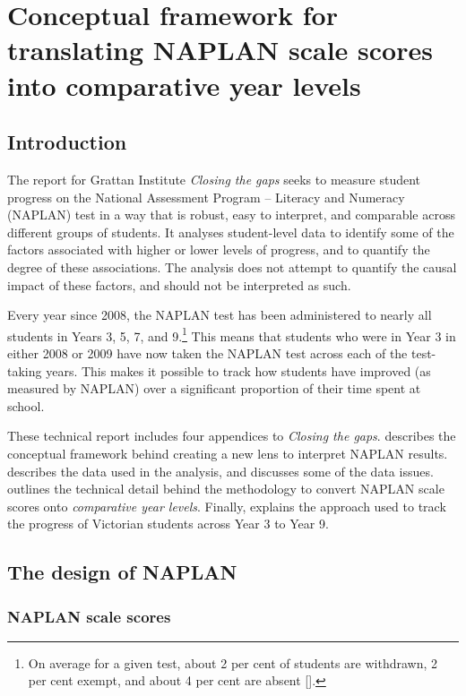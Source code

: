 \chapter{Conceptual framework for translating NAPLAN scale scores into comparative year levels} \label{chap1}

\section{Introduction}

The report for Grattan Institute \textit{Closing the gaps} seeks to measure student progress on the National Assessment Program -- Literacy and Numeracy (NAPLAN) test in a way that is robust, easy to interpret, and comparable across different groups of students. It analyses student-level data to identify some of the factors associated with higher or lower levels of progress, and to quantify the degree of these associations. The analysis does not attempt to quantify the causal impact of these factors, and should not be interpreted as such.

Every year since 2008, the NAPLAN test has been administered to nearly all students in Years 3, 5, 7, and 9.\footnote{On average for a given test, about 2 per cent of students are withdrawn, 2 per cent exempt, and about 4 per cent are absent [\textcite{acara2014}].} This means that students who were in Year 3 in either 2008 or 2009 have now taken the NAPLAN test across each of the test-taking years. This makes it possible to track how students have improved (as measured by NAPLAN) over a significant proportion of their time spent at school.

These technical report includes four appendices to \textit{Closing the gaps}.  describes the conceptual framework behind creating a new lens to interpret NAPLAN results.  describes the data used in the analysis, and discusses some of the data issues.  outlines the technical detail behind the methodology to convert NAPLAN scale scores onto \textit{comparative year levels}. Finally,  explains the approach used to track the progress of Victorian students across Year 3 to Year 9.

\section{The design of NAPLAN}

\subsection{NAPLAN scale scores}

